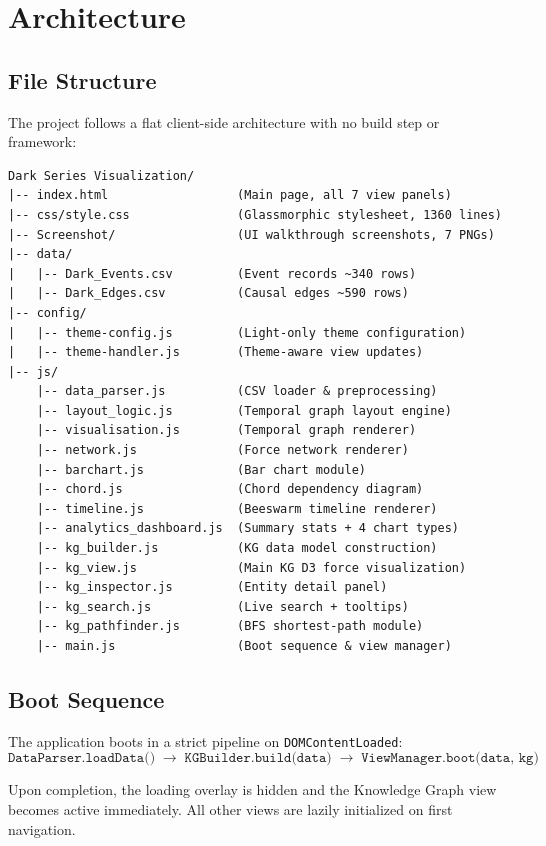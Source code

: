\documentclass[11pt,a4paper]{article}
\begin{document}
\section{Architecture}

\subsection{File Structure}

The project follows a flat client-side architecture with no build step or framework:

\begin{verbatim}
Dark Series Visualization/
|-- index.html                  (Main page, all 7 view panels)
|-- css/style.css               (Glassmorphic stylesheet, 1360 lines)
|-- Screenshot/                 (UI walkthrough screenshots, 7 PNGs)
|-- data/
|   |-- Dark_Events.csv         (Event records ~340 rows)
|   |-- Dark_Edges.csv          (Causal edges ~590 rows)
|-- config/
|   |-- theme-config.js         (Light-only theme configuration)
|   |-- theme-handler.js        (Theme-aware view updates)
|-- js/
    |-- data_parser.js          (CSV loader & preprocessing)
    |-- layout_logic.js         (Temporal graph layout engine)
    |-- visualisation.js        (Temporal graph renderer)
    |-- network.js              (Force network renderer)
    |-- barchart.js             (Bar chart module)
    |-- chord.js                (Chord dependency diagram)
    |-- timeline.js             (Beeswarm timeline renderer)
    |-- analytics_dashboard.js  (Summary stats + 4 chart types)
    |-- kg_builder.js           (KG data model construction)
    |-- kg_view.js              (Main KG D3 force visualization)
    |-- kg_inspector.js         (Entity detail panel)
    |-- kg_search.js            (Live search + tooltips)
    |-- kg_pathfinder.js        (BFS shortest-path module)
    |-- main.js                 (Boot sequence & view manager)
\end{verbatim}

\subsection{Boot Sequence}

The application boots in a strict pipeline on \texttt{DOMContentLoaded}:
\[
\texttt{DataParser.loadData()} \;\rightarrow\; \texttt{KGBuilder.build(data)} \;\rightarrow\; \texttt{ViewManager.boot(data, kg)}
\]

Upon completion, the loading overlay is hidden and the Knowledge Graph view becomes active immediately. All other views are lazily initialized on first navigation.
\end{document}
